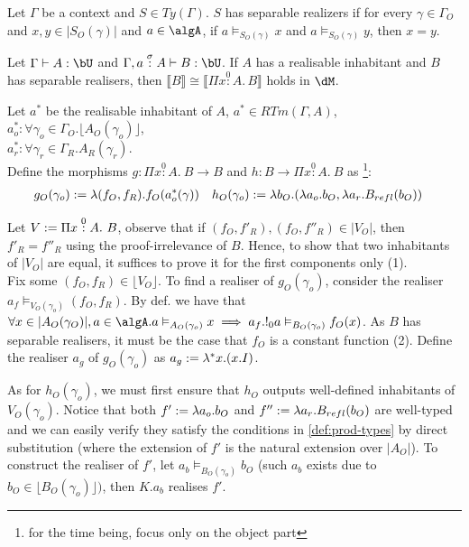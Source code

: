 \documentclass[12pt,a4paper]{article}
\def\rfl{_{refl}}
\renewcommand{\O}{_{O}}\alwaysmath{O}
\newcommand{\R}{\ensuremath{_{R}}}
\begin{document}
\begin{definition}
  Let $\Gamma$ be a context and $S \in Ty(\Gamma)$. $S$ has separable realizers if for every $\gamma \in \Gamma\O$ and $x, y  \in |S\O(\gamma)|$ and $a \in \algA$, if $a \vDash_{S\O(\gamma)} x$ and $a \vDash_{S\O(\gamma)} y$, then $x = y$.
\end{definition}

\begin{thm}
    Let $\Gamma \vdash A : \bU$ and $\Gamma, a \overset{\sigma}{:} A \vdash B : \bU$. If $A$ has a realisable inhabitant and $B$ has separable realisers, then $ \llbracket B \rrbracket \cong \llbracket \Pi x \overset{0}:A.\, B \rrbracket$ holds in $\dM$.
\end{thm}
Let $a^*$ be the realisable inhabitant of $A$, $a^* \in RTm(\Gamma, A)$, $a^*_o : \forall \gamma_o \in \Gamma\O.\lfloor A\O(\gamma_o) \rfloor$,\\ $a^*_r : \forall \gamma_r \in \Gamma\R . A\R(\gamma_r)$. \\
Define the morphisms $g : \Pi x \overset{0}:A.\ B \to B$ and $h : B \to \Pi x \overset{0}:A.\ B$ as \footnote{for the time being, focus only on the object part}:
\begin{align*}
{g\O}(\gamma_o) &\define \lambda (f\O, f\R). f\O(a^*_o(\gamma)) && {h\O}(\gamma_o) \define \lambda b\O. (\lambda a_o. b\O, \lambda a_r. B\rfl(b\O))
\end{align*}

Let $V \define \Pi x \overset{0}:A.\ B$, observe that if $(f\O, f'\R), (f\O, f''\R) \in |V\O|$, then $f'\R = f''\R$ using the proof-irrelevance of $B$. Hence, to show that two inhabitants of $|V\O|$ are equal, it suffices to prove it for the first components only (1).\\

Fix some $(f\O, f\R) \in \lfloor V\O \rfloor$. To find a realiser of $g\O(\gamma_o)$, consider the realiser $a_f \vDash_{V\O(\gamma_o)} (f\O, f\R)$. By def. we have that $\forall x \in |A\O(\gamma_O)|, a \in \algA . a \vDash_{A\O(\gamma_o)} x \implies a_f . !_0 a \vDash_{B\O(\gamma_o)} f\O(x)$. As $B$ has separable realisers, it must be the case that $f\O$ is a constant function (2). Define the realiser $a_g$ of $g\O(\gamma_o)$ as $a_g := \lambda^* x. (x . I)$.

As for $h\O(\gamma_o)$, we must first ensure that $h\O$ outputs well-defined inhabitants of $V\O(\gamma_o)$. Notice that both $f' \define \lambda a_o. b\O$ and $f'' \define \lambda a_r. B\rfl(b\O)$ are well-typed and we can easily verify they satisfy the conditions in \cref{def:prod-types} by direct substitution (where the extension of $f'$ is the natural extension over $|A\O|$). To construct the realiser of $f'$, let $a_b \vDash_{B\O(\gamma_o)} b\O$ (such $a_b$ exists due to $b\O \in \lfloor B\O(\gamma_o)\rfloor)$, then $K. a_b$ realises $f'$.\\
\end{document}
